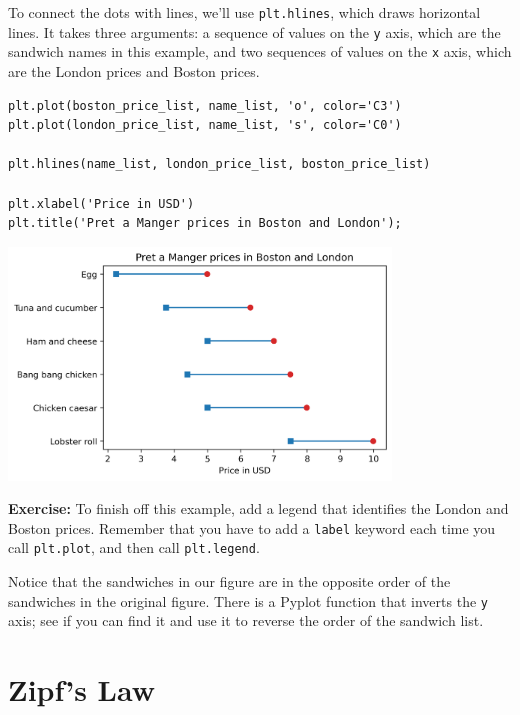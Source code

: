 To connect the dots with lines, we'll use
\passthrough{\lstinline!plt.hlines!}, which draws horizontal lines. It
takes three arguments: a sequence of values on the
\passthrough{\lstinline!y!} axis, which are the sandwich names in this
example, and two sequences of values on the \passthrough{\lstinline!x!}
axis, which are the London prices and Boston prices.

\begin{lstlisting}[]
plt.plot(boston_price_list, name_list, 'o', color='C3')
plt.plot(london_price_list, name_list, 's', color='C0')

plt.hlines(name_list, london_price_list, boston_price_list)

plt.xlabel('Price in USD')
plt.title('Pret a Manger prices in Boston and London');
\end{lstlisting}

\begin{center}
\includegraphics[width=4in]{06_plotting_files/06_plotting_47_0.png}
\end{center}

\textbf{Exercise:} To finish off this example, add a legend that
identifies the London and Boston prices. Remember that you have to add a
\passthrough{\lstinline!label!} keyword each time you call
\passthrough{\lstinline!plt.plot!}, and then call
\passthrough{\lstinline!plt.legend!}.

Notice that the sandwiches in our figure are in the opposite order of
the sandwiches in the original figure. There is a Pyplot function that
inverts the \passthrough{\lstinline!y!} axis; see if you can find it and
use it to reverse the order of the sandwich list.

\hypertarget{zipfs-law}{%
\section{Zipf's Law}\label{zipfs-law}}

